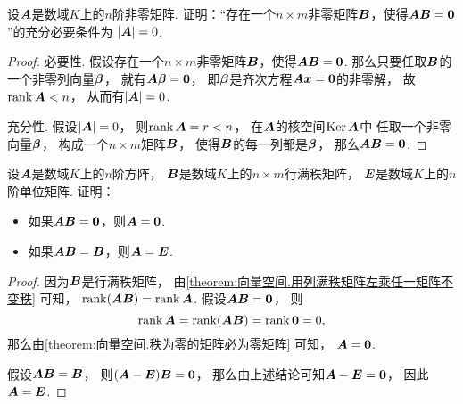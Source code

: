 \begin{example}
设\(\boldsymbol{A}\)是数域\(K\)上的\(n\)阶非零矩阵.
证明：“存在一个\(n \times m\)非零矩阵\(\boldsymbol{B}\)，使得\(\boldsymbol{A}\boldsymbol{B}=\boldsymbol0\)”的充分必要条件为
\(\abs{\boldsymbol{A}}=0\).
\begin{proof}
必要性.
假设存在一个\(n \times m\)非零矩阵\(\boldsymbol{B}\)，使得\(\boldsymbol{A}\boldsymbol{B}=\boldsymbol0\).
那么只要任取\(\boldsymbol{B}\)的一个非零列向量\(\boldsymbol\beta\)，
就有\(\boldsymbol{A}\boldsymbol\beta = \boldsymbol0\)，
即\(\boldsymbol\beta\)是齐次方程\(\boldsymbol{A}\boldsymbol{x}=\boldsymbol0\)的非零解，
故\(\rank\boldsymbol{A}<n\)，
从而有\(\abs{\boldsymbol{A}}=0\).

充分性.
假设\(\abs{\boldsymbol{A}}=0\)，
则\(\rank\boldsymbol{A} = r < n\)，
在\(\boldsymbol{A}\)的核空间\(\operatorname{Ker}\boldsymbol{A}\)中
任取一个非零向量\(\boldsymbol\beta\)，
构成一个\(n \times m\)矩阵\(\boldsymbol{B}\)，
使得\(\boldsymbol{B}\)的每一列都是\(\boldsymbol\beta\)，
那么\(\boldsymbol{A}\boldsymbol{B}=\boldsymbol0\).
\end{proof}
\end{example}
\begin{example}
设\(\boldsymbol{A}\)是数域\(K\)上的\(n\)阶方阵，
\(\boldsymbol{B}\)是数域\(K\)上的\(n \times m\)行满秩矩阵，
\(\boldsymbol{E}\)是数域\(K\)上的\(n\)阶单位矩阵.
证明：\begin{itemize}
	\item 如果\(\boldsymbol{A}\boldsymbol{B}=\boldsymbol0\)，则\(\boldsymbol{A}=\boldsymbol0\).
	\item 如果\(\boldsymbol{A}\boldsymbol{B}=\boldsymbol{B}\)，则\(\boldsymbol{A}=\boldsymbol{E}\).
\end{itemize}
\begin{proof}
因为\(\boldsymbol{B}\)是行满秩矩阵，
由\cref{theorem:向量空间.用列满秩矩阵左乘任一矩阵不变秩} 可知，
\(\rank(\boldsymbol{A}\boldsymbol{B}) = \rank\boldsymbol{A}\).
假设\(\boldsymbol{A}\boldsymbol{B}=\boldsymbol0\)，
则\begin{equation*}
	\rank\boldsymbol{A}=\rank(\boldsymbol{A}\boldsymbol{B})=\rank\boldsymbol0=0,
\end{equation*}
那么由\cref{theorem:向量空间.秩为零的矩阵必为零矩阵} 可知，
\(\boldsymbol{A}=\boldsymbol0\).

假设\(\boldsymbol{A}\boldsymbol{B}=\boldsymbol{B}\)，
则\((\boldsymbol{A}-\boldsymbol{E})\boldsymbol{B}=\boldsymbol0\)，
那么由上述结论可知\(\boldsymbol{A}-\boldsymbol{E}=\boldsymbol0\)，
因此\(\boldsymbol{A}=\boldsymbol{E}\).
\end{proof}
\end{example}

